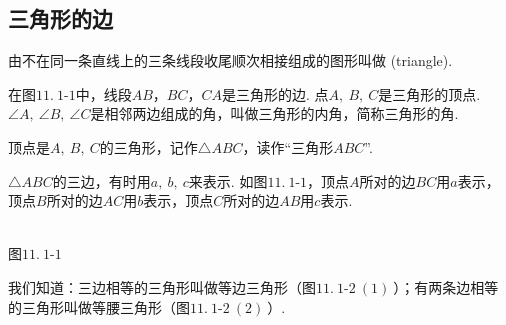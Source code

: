 \documentclass[UTF8,fontset=macnew]{book} %
\begin{document}
			\subsection{三角形的边}
				由不在同一条直线上的三条线段收尾顺次相接组成的图形叫做\textcolor[RGB]{4,165,218}{} (triangle).
				
				在图$11.\ 1$-$1$中，线段$AB$，$BC$，$CA$是三角形的边. 点$A,\ B,\ C$是三角形的顶点. $\angle A,\ \angle B,\ \angle C$是相邻两边组成的角，叫做三角形的内角，简称三角形的角.
				
				顶点是$A,\ B,\ C$的三角形，记作$\triangle ABC$，读作“三角形$ABC$”.
				
				$\triangle ABC$的三边，有时用$a,\ b,\ c$来表示. 如图$11.\ 1$-$1$，顶点$A$所对的边$BC$用$a$表示，顶点$B$所对的边$AC$用$b$表示，顶点$C$所对的边$AB$用$c$表示.
				\begin{center}
					\\图$11.\ 1$-$1$
				\end{center}
				
				我们知道：三边相等的三角形叫做等边三角形（图$11.\ 1$-$2\ (1)\ $）；有两条边相等的三角形叫做等腰三角形（图$11.\ 1$-$2\ (2)\ $）.
				
\end{document}

